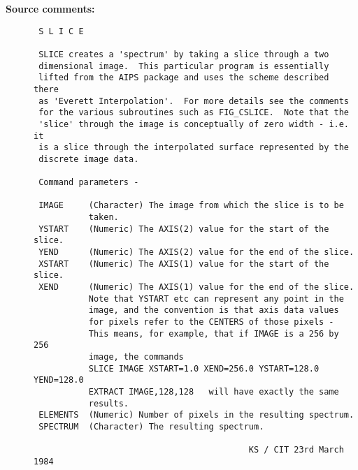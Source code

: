 \begin{description}
\item [{\bf Source comments:}]
\begin{verbatim}
 S L I C E

 SLICE creates a 'spectrum' by taking a slice through a two
 dimensional image.  This particular program is essentially
 lifted from the AIPS package and uses the scheme described there
 as 'Everett Interpolation'.  For more details see the comments
 for the various subroutines such as FIG_CSLICE.  Note that the
 'slice' through the image is conceptually of zero width - i.e. it
 is a slice through the interpolated surface represented by the
 discrete image data.

 Command parameters -

 IMAGE     (Character) The image from which the slice is to be
           taken.
 YSTART    (Numeric) The AXIS(2) value for the start of the slice.
 YEND      (Numeric) The AXIS(2) value for the end of the slice.
 XSTART    (Numeric) The AXIS(1) value for the start of the slice.
 XEND      (Numeric) The AXIS(1) value for the end of the slice.
           Note that YSTART etc can represent any point in the
           image, and the convention is that axis data values
           for pixels refer to the CENTERS of those pixels -
           This means, for example, that if IMAGE is a 256 by 256
           image, the commands
           SLICE IMAGE XSTART=1.0 XEND=256.0 YSTART=128.0 YEND=128.0
           EXTRACT IMAGE,128,128   will have exactly the same
           results.
 ELEMENTS  (Numeric) Number of pixels in the resulting spectrum.
 SPECTRUM  (Character) The resulting spectrum.

                                           KS / CIT 23rd March 1984
\end{verbatim}
\end{description}
